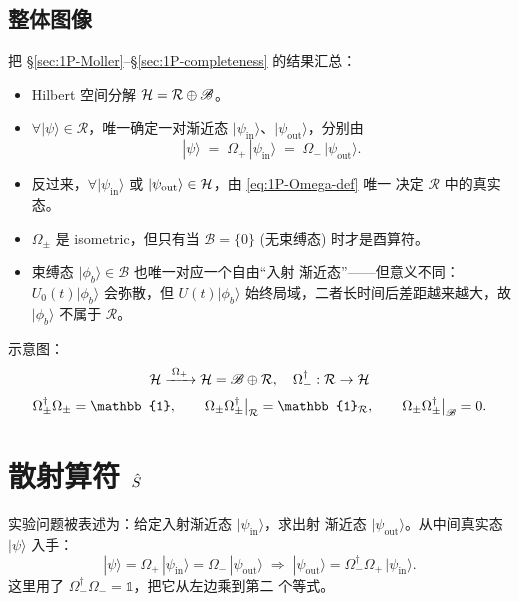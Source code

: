 \subsection{整体图像}
\label{ssec:1P-bigPicture}

把 \S\ref{sec:1P-Moller}--\S\ref{sec:1P-completeness} 的结果汇总：

\begin{itemize}
\item Hilbert 空间分解 $\mathcal{H} = \mathcal{R}\oplus\mathscr{B}$。
\item $\forall |\psi\rangle\in\mathcal{R}$，唯一确定一对渐近态
  $|\psi_{\text{in}}\rangle$、$|\psi_{\text{out}}\rangle$，分别由
\begin{equation}
  |\psi\rangle \;=\; \Omega_+\,|\psi_{\text{in}}\rangle
              \;=\; \Omega_-\,|\psi_{\text{out}}\rangle.
  \label{eq:1P-psi-asym}
\end{equation}
\item 反过来，$\forall |\psi_{\text{in}}\rangle$ 或
  $|\psi_{\text{out}}\rangle\in\mathcal{H}$，由 \eqref{eq:1P-Omega-def} 唯一
  决定 $\mathcal{R}$ 中的真实态。
\item $\Omega_\pm$ 是 isometric，但只有当 $\mathscr{B}=\{0\}$
  (无束缚态) 时才是酉算符。
\item 束缚态 $|\phi_b\rangle\in\mathscr{B}$ 也唯一对应一个自由“入射
  渐近态”——但意义不同：$U_0(t)|\phi_b\rangle$ 会弥散，但
  $U(t)|\phi_b\rangle$ 始终局域，二者长时间后差距越来越大，故
  $|\phi_b\rangle$ 不属于 $\mathcal{R}$。
\end{itemize}

示意图：
\[
  \begin{array}{c}
  \Hilb \xrightarrow{\;\Omega_+\;} \Hilb=\mathscr{B}\oplus\mathcal{R},
  \quad
  \Omega_-^{\dagger}:\mathcal{R}\to\Hilb\\[2mm]
  \Omega_\pm^{\dagger}\Omega_\pm = \mathbb{1},\qquad
  \Omega_\pm\Omega_\pm^{\dagger}\bigr|_{\mathcal{R}}=\mathbb{1}_{\mathcal{R}},\qquad
  \Omega_\pm\Omega_\pm^{\dagger}\bigr|_{\mathscr{B}}=0.
  \end{array}
\]

\section{散射算符 $\hat{S}$}
\label{sec:1P-Smat}

实验问题被表述为：给定入射渐近态 $|\psi_{\text{in}}\rangle$，求出射
渐近态 $|\psi_{\text{out}}\rangle$。从中间真实态 $|\psi\rangle$ 入手：
\[
  |\psi\rangle = \Omega_+\,|\psi_{\text{in}}\rangle
              = \Omega_-\,|\psi_{\text{out}}\rangle
  \;\Longrightarrow\;
  |\psi_{\text{out}}\rangle = \Omega_-^{\dagger}\Omega_+\,|\psi_{\text{in}}\rangle.
\]
这里用了 $\Omega_-^{\dagger}\Omega_-=\mathbb{1}$，把它从左边乘到第二
个等式。

